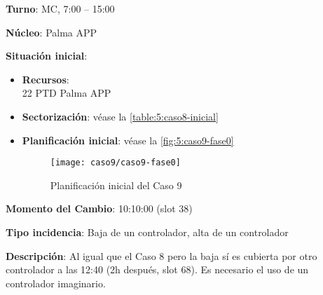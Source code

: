 \textbf{Turno}: MC, 7:00 -- 15:00

\textbf{Núcleo}: Palma APP

\textbf{Situación inicial}:
\begin{itemize}[label={}]
	
	\item \textbf{Recursos}: \\
	22 PTD Palma APP
	
	\item \textbf{Sectorización}: véase la \autoref{table:5:caso8-inicial}
	
	\item \textbf{Planificación inicial}: véase la \autoref{fig:5:caso9-fase0}
	
	\begin{figure}[!h]
		\centering
		\texttt{[image: caso9/caso9-fase0]}
		\caption{Planificación inicial del Caso 9}
		\label{fig:5:caso9-fase0}
	\end{figure}
	
\end{itemize}

\textbf{Momento del Cambio}: 10:10:00 (slot 38)

\textbf{Tipo incidencia}: Baja de un controlador, alta de un controlador

\textbf{Descripción}: Al igual que el Caso 8 pero la baja sí es cubierta por otro controlador a las 12:40 (2h después, slot 68). Es necesario el uso de un controlador imaginario.
